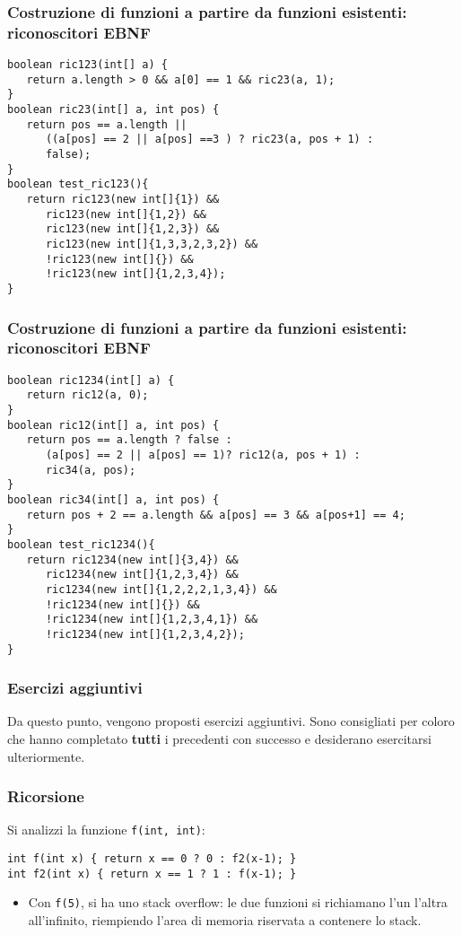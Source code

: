 \documentclass{beamer}
\begin{document}
\begin{frame}[fragile]
\frametitle{Costruzione di funzioni a partire da funzioni esistenti: riconoscitori EBNF}
\begin{verbatim}
boolean ric123(int[] a) {
   return a.length > 0 && a[0] == 1 && ric23(a, 1);
}
boolean ric23(int[] a, int pos) {
   return pos == a.length ||
      ((a[pos] == 2 || a[pos] ==3 ) ? ric23(a, pos + 1) :
      false);
}
boolean test_ric123(){
   return ric123(new int[]{1}) &&
      ric123(new int[]{1,2}) &&
      ric123(new int[]{1,2,3}) &&
      ric123(new int[]{1,3,3,2,3,2}) &&
      !ric123(new int[]{}) &&
      !ric123(new int[]{1,2,3,4});
}
\end{verbatim}
\end{frame}

\begin{frame}[fragile]
\frametitle{Costruzione di funzioni a partire da funzioni esistenti: riconoscitori EBNF}
\scriptsize
\begin{verbatim}
boolean ric1234(int[] a) {
   return ric12(a, 0);
}
boolean ric12(int[] a, int pos) {
   return pos == a.length ? false :
      (a[pos] == 2 || a[pos] == 1)? ric12(a, pos + 1) : 
      ric34(a, pos);
}
boolean ric34(int[] a, int pos) {
   return pos + 2 == a.length && a[pos] == 3 && a[pos+1] == 4;
}
boolean test_ric1234(){
   return ric1234(new int[]{3,4}) &&
      ric1234(new int[]{1,2,3,4}) &&
      ric1234(new int[]{1,2,2,2,1,3,4}) &&
      !ric1234(new int[]{}) &&
      !ric1234(new int[]{1,2,3,4,1}) &&
      !ric1234(new int[]{1,2,3,4,2});
}
\end{verbatim}
\end{frame}

\begin{frame}[fragile]
\frametitle{Esercizi aggiuntivi}
Da questo punto, vengono proposti esercizi aggiuntivi. Sono consigliati per coloro che hanno completato \textbf{tutti} i precedenti con successo e desiderano esercitarsi ulteriormente.
\end{frame}

\begin{frame}[fragile]
\frametitle{Ricorsione}
Si analizzi la funzione \texttt{f(int, int)}:
\begin{verbatim}
int f(int x) { return x == 0 ? 0 : f2(x-1); }
int f2(int x) { return x == 1 ? 1 : f(x-1); }
\end{verbatim}
\begin{itemize}
 \item Con \texttt{f(5)}, si ha uno stack overflow: le due funzioni si richiamano l'un l'altra all'infinito, riempiendo l'area di memoria riservata a contenere lo stack.
\end{itemize}
\end{frame}
\end{document}
